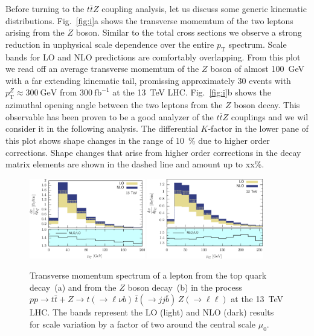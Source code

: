 \documentclass[preprint]{JHEP3} %
\newcommand{\GeV}{\mathrm{GeV}}
\newcommand{\pT}{p_{\mathrm{T}}}
\def\ttbZ{t\bar{t}Z}
\def\ttb{t\bar{t}}
\begin{document}
Before turning to the $\ttbZ$ coupling analysis, let us discuss some generic kinematic distributions.
Fig.~\ref{fig:i}a shows the transverse momemtum of the two leptons arising from the $Z$ boson.
Similar to the total cross sections we observe a strong reduction in unphysical scale dependence over the entire $\pT$ spectrum.
Scale bands for LO and NLO predictions are comfortably overlapping. 
From this plot we read off an average transverse momemtum of the $Z$ boson of almost 100~GeV with a far extending kinematic tail,
promissing approximately 30 events with $\pT^Z \approx 300~\GeV$ from $300~\mathrm{fb}^{-1}$ at the 13~TeV LHC. 
Fig.~\ref{fig:i}b shows the azimuthal opening angle between the two leptons from the $Z$ boson decay.
This observable has been proven to be a good analyzer of the $\ttbZ$ couplings \cite{Baur:2004uw} and we wil consider it in the following analysis.
The differential $K$-factor in the lower pane of this plot shows shape changes in the range of 10~\% due to higher order corrections.
Shape changes that arise from higher order corrections in the decay matrix elements are shown in the dashed line and amount up to xx\%.


\begin{figure}[t]
\centering %
\includegraphics[width=0.45\textwidth]{./LHC_53_Fig01.eps}
\hfill
\includegraphics[width=0.45\textwidth]{./LHC_53_Fig03.eps}
\caption{\label{fig:ii} Transverse momentum spectrum of a lepton from the top quark decay~(a) and from the $Z$ boson decay~(b) 
in the process $pp \to \ttb + Z \to t(\to \ell \nu b) \, \bar{t} (\to jj \bar{b}) \, Z(\to \ell \ell)$ at the 13~TeV LHC.
The bands represent the LO (light) and NLO (dark) results for scale variation by a factor of two around the central scale $\mu_0$.}
\end{figure}
\end{document}

